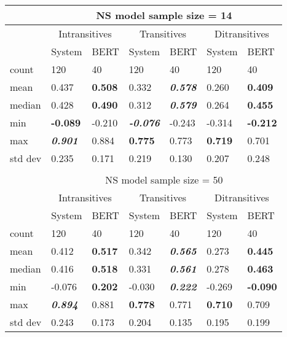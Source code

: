 \begin{table}[htb!]
\begin{center}
\begin{tabular}{|l||l|l||l|l||l|l|}
\hline
 & \multicolumn{6}{c|}{NS model sample size = 14} \\
\hline
 & \multicolumn{2}{c||}{Intransitives} & \multicolumn{2}{c||}{Transitives} & \multicolumn{2}{c|}{Ditransitives} \\
\hline
		& System 	& BERT 		& System 	& BERT 		& System 	& BERT 		\\
\hline
\hline
count 	& 120 		& 40 		& 120 		& 40 		& 120 		& 40		 \\
\hline
mean 	& 0.437 	& \textbf{0.508} 	& 0.332 	& \textit{\textbf{0.578}}		& 0.260 	& \textbf{0.409}	 \\
\hline
median 	& 0.428 	& \textbf{0.490} 	& 0.312 	& \textit{\textbf{0.579}}		& 0.264 	& \textbf{0.455}	 \\
\hline
min 	& \textbf{-0.089} 	& -0.210 	& \textit{\textbf{-0.076}} 	& -0.243	& -0.314 	& \textbf{-0.212}	 \\
\hline
max 	& \textit{\textbf{0.901}} 	& 0.884		& \textbf{0.775} 	& 0.773		& \textbf{0.719} 	& 0.701	 \\
\hline
std dev & 0.235 	& 0.171		& 0.219 	& 0.130		& 0.207 	& 0.248	 \\
\hline
\multicolumn{7}{c}{} \\
\hline
 & \multicolumn{6}{c|}{NS model sample size = 50} \\
\hline
 & \multicolumn{2}{c||}{Intransitives} & \multicolumn{2}{c||}{Transitives} & \multicolumn{2}{c|}{Ditransitives} \\
\hline
		& System 	& BERT 				& System 	& BERT 						& System 	& BERT \\
\hline
\hline
count 	& 120 		& 40 				& 120 		& 40 						& 120 		& 40 	\\
\hline
mean 	& 0.412 	& \textbf{0.517} 	& 0.342 	& \textit{\textbf{0.565}}	& 0.273 	& \textbf{0.445} \\
\hline
median 	& 0.416 	& \textbf{0.518}	& 0.331 	& \textit{\textbf{0.561}}	& 0.278 	& \textbf{0.463} \\
\hline
min 	& -0.076 	& \textbf{0.202}	& -0.030 	& \textit{\textbf{0.222}}	 & -0.269 	& \textbf{-0.090} \\
\hline
max & \textit{\textbf{0.894}} & 0.881	& \textbf{0.778} & 0.771	 			& \textbf{0.710} 	& 0.709 \\
\hline
std dev & 0.243 	& 0.173 			& 0.204 	& 0.135 					& 0.195 	& 0.199 \\

\end{tabular}
\end{center}
\end{table}
